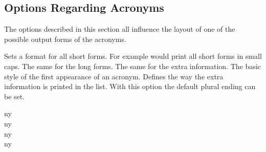\documentclass[DIV10,toc=index,toc=bib]{cnpkgdoc}
\begin{document}
\subsection{Options Regarding Acronyms}
The options described in this section all influence the layout of one of the
possible output forms of the acronyms.
\begin{beschreibung}
 \Default Sets a format for all short forms.
 For example  would print all short forms in
 small caps.
 \Default The same for the long forms.
 \Default The same for the extra information.
 The basic style of the first appearance of an acronym.
  Defines the way
 the extra information is printed in the list.
  With this option the default
 plural ending can be set.
\end{beschreibung}

\begin{beispiel}
 \acf{ny} \\
 \acf{ny} \\
 \acf{ny} \\
 \acf{ny}
\end{beispiel}
\end{document}
